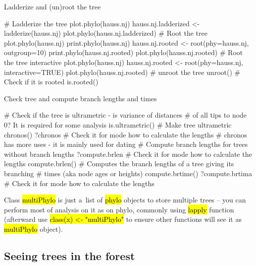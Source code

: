 \documentclass[compress, ucs, xelatex, 11pt, xcolor=svgnames,
  hyperref={
    bookmarks=true,
    unicode=true,
    colorlinks=true,
    pdftitle={Molecular data in R},
    plainpages=false,
    pdfauthor={Vojtech Zeisek},
    pdfsubject={Course about phylogeny and evolution in R},
    pdfcreator={XeLaTeX},
    pdfkeywords={R, evolution, phylogeny, molecular data},
    linkcolor=Tomato,
    anchorcolor=SaddleBrown,
    citecolor=Goldenrod,
    filecolor=DarkMagenta,
    menucolor=Sienna,
    urlcolor=DarkTurquoise,
    pdftex},
  url={hyphens, lowtilde} %
  ]{beamer}
\renewcommand{\texttt}[1]{\hl{\ttfamily #1}}
\begin{document}
\begin{frame}[fragile]{Ladderize and (un)root the tree}
  \begin{spluscode}
    # Ladderize the tree
    plot.phylo(hauss.nj)
    hauss.nj.ladderized <- ladderize(hauss.nj)
    plot.phylo(hauss.nj.ladderized)
    # Root the tree
    plot.phylo(hauss.nj)
    print.phylo(hauss.nj)
    hauss.nj.rooted <- root(phy=hauss.nj, outgroup=10)
    print.phylo(hauss.nj.rooted)
    plot.phylo(hauss.nj.rooted)
    # Root the tree interactive
    plot.phylo(hauss.nj)
    hauss.nj.rooted <- root(phy=hauss.nj, interactive=TRUE)
    plot.phylo(hauss.nj.rooted)
    # unroot the tree
    unroot()
    # Check if it is rooted
    is.rooted()
  \end{spluscode}
\end{frame}

\begin{frame}[fragile]{Check tree and compute branch lengths and times}
  \begin{spluscode}
    # Check if the tree is ultrametric - is variance of distances
    # of all tips to node 0? It is required for some analysis
    is.ultrametric()
    # Make tree ultrametric
    chronos()
    ?chronos # Check it for mode how to calculate the lengths
    # chronos has more uses - it is mainly used for dating
    # Compute branch lengths for trees without branch lengths
    ?compute.brlen # Check it for mode how to calculate the lengths
    compute.brlen()
    # Computes the branch lengths of a tree giving its branching
    # times (aka node ages or heights)
    compute.brtime()
    ?compute.brtima # Check it for mode how to calculate the lengths
  \end{spluscode}
Class \texttt{multiPhylo} is just a~list of \texttt{phylo} objects to store multiple trees -- you can perform most of analysis on it as on phylo, commonly using \texttt{lapply} function (afterward use \texttt{class(x) <- "multiPhylo"} to ensure other functions will see it as \texttt{multiPhylo} object).
\end{frame}

\subsection{Seeing trees in the forest}
\end{document}
